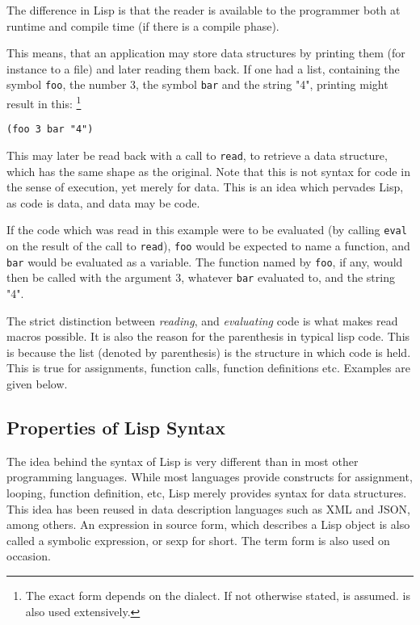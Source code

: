 \documentclass[a4paper]{article}
\newcommand{\sym}[1]{\texttt{#1}}
\newcommand{\fun}[1]{\texttt{#1}}
\begin{document}
The difference in Lisp is that the reader is available to the programmer both at
runtime and compile time (if there is a compile phase).

This means, that an application may store data structures by printing them (for
instance to a file) and later reading them back.  If one had a list, containing
the symbol \sym{foo}, the number 3, the symbol \sym{bar} and the string "4",
printing might result in this: \footnote{The exact form depends on the dialect.
  If not otherwise stated, is assumed.  is also used extensively.}

\begin{verbatim}
(foo 3 bar "4")
\end{verbatim}

This may later be read back with a call to \fun{read}, to retrieve a data
structure, which has the same shape as the original.  Note that this is not
syntax for code in the sense of execution, yet merely for data.  This is an idea
which pervades Lisp, as code is data, and data may be code.

If the code which was read in this example were to be evaluated (by calling
\fun{eval} on the result of the call to \fun{read}), \sym{foo} would be expected
to name a function, and \sym{bar} would be evaluated as a variable.  The
function named by \sym{foo}, if any, would then be called with the argument 3,
whatever \sym{bar} evaluated to, and the string "4".

The strict distinction between \emph{reading}, and \emph{evaluating} code is
what makes read macros possible.  It is also the reason for the parenthesis in
typical lisp code.  This is because the list (denoted by parenthesis) is the
structure in which code is held.  This is true for assignments, function calls,
function definitions etc.  Examples are given below.

\subsection{Properties of Lisp Syntax}
\label{subsec:properties-of-lisp-syntax}

The idea behind the syntax of Lisp is very different than in most other
programming languages.  While most languages provide constructs for assignment,
looping, function definition, etc, Lisp merely provides syntax for data
structures.  This idea has been reused in data description languages such as XML
and JSON, among others.  An expression in source form, which describes a Lisp
object is also called a symbolic expression, or sexp for short.  The term form
is also used on occasion.
\end{document}
